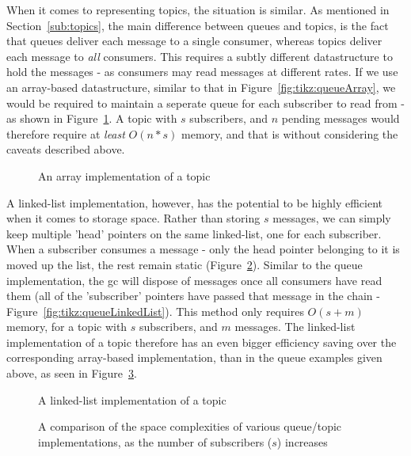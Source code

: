 When it comes to representing topics, the situation is similar. As mentioned in
Section~\ref{sub:topics}, the main difference between queues and topics, is the
fact that queues deliver each message to a single consumer, whereas topics
deliver each message to \emph{all} consumers. This requires a subtly different
datastructure to hold the messages - as consumers may read messages at different
rates. If we use an array-based datastructure, similar to that in
Figure~\ref{fig:tikz:queueArray}, we would be required to maintain a seperate
queue for each subscriber to read from - as shown in
Figure~\ref{fig:tikz:arrayTopic}. A topic with $s$ subscribers, and $n$ pending
messages would therefore require at \emph{least} $O(n * s)$ memory, and that is
without considering the caveats described above. \\

\begin{figure}[H]
  \centering
  
  \caption{An array implementation of a topic}
  \label{fig:tikz:arrayTopic}
\end{figure}

A linked-list implementation, however, has the potential to be highly efficient
when it comes to storage space. Rather than storing $s$ messages, we can simply
keep multiple 'head' pointers on the same linked-list, one for each subscriber.
When a subscriber consumes a message - only the head pointer belonging to it is
moved up the list, the rest remain static
(Figure~\ref{fig:tikz:linkedListTopic}). Similar to the queue implementation,
the \gls{gc} will dispose of messages once all consumers have read them (all of
the 'subscriber' pointers have passed that message in the chain -
Figure~\ref{fig:tikz:queueLinkedList}). This method only requires $O(s + m)$
memory, for a topic with $s$ subscribers, and $m$ messages. The linked-list
implementation of a topic therefore has an even bigger efficiency saving over
the corresponding array-based implementation, than in the queue examples given
above, as seen in Figure~\ref{fig:tikz:implementationSpaceComplexityGraph}.

\begin{figure}[H]
  \centering
  
  \caption{A linked-list implementation of a topic}
  \label{fig:tikz:linkedListTopic}
\end{figure}

\begin{figure}[H]
  \centering
  
  \caption{A comparison of the space complexities of various queue/topic
           implementations, as the number of subscribers ($s$) increases}
  \label{fig:tikz:implementationSpaceComplexityGraph}
\end{figure}

